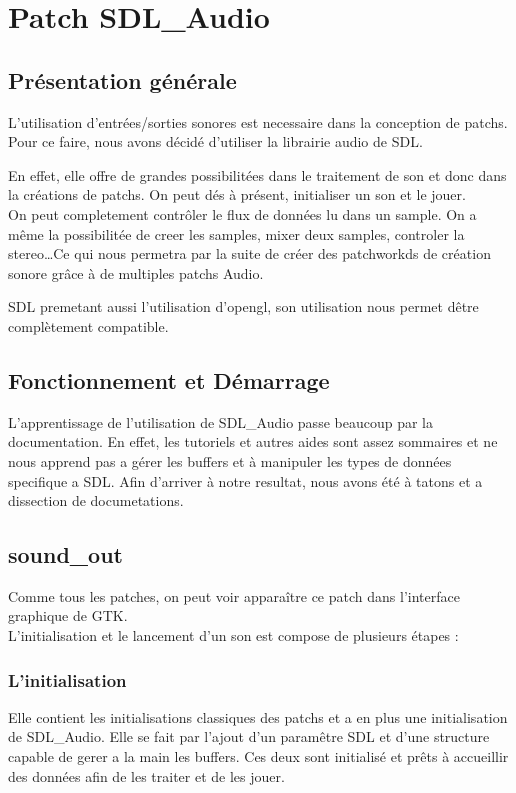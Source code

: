 \newpage
\section{Patch SDL\_Audio}

\subsection{Pr\'esentation g\'en\'erale}
\par
L'utilisation d'entr\'ees/sorties sonores est necessaire dans la conception de 
patchs. Pour ce faire, nous avons d\'ecid\'e d'utiliser la librairie audio de SDL. 
\\
\par
En effet, elle offre de grandes possibilit\'ees dans le traitement de son et donc 
dans la cr\'eations de patchs. On peut d\'es \`a pr\'esent, initialiser un son 
et le jouer. 
\\
On peut completement contr\^oler le flux de donn\'ees lu dans un sample. 
On a m\^eme la possibilit\'ee de creer les samples, mixer deux samples, controler 
la stereo\ldots Ce qui nous permetra par la suite de cr\'eer des patchworkds de 
cr\'eation sonore gr\^ace \`a de multiples patchs Audio.
\\
\par
SDL premetant aussi l'utilisation d'opengl, son utilisation nous permet d\^etre 
compl\`etement compatible.

\subsection{Fonctionnement et D\'emarrage}
L'apprentissage de l'utilisation de SDL\_Audio passe beaucoup par la documentation. 
En effet, les tutoriels et autres aides sont assez sommaires et ne nous apprend pas a 
g\'erer les buffers et \`a manipuler les types de donn\'ees specifique a SDL. Afin 
d'arriver \`a notre resultat, nous avons \'et\'e \`a tatons et a dissection de documetations.

\newpage
\subsection{sound\_out}
\par
Comme tous les patches, on peut voir appara\^itre ce patch dans l'interface graphique de GTK.
\\
L'initialisation et le lancement d'un son est compose de plusieurs \'etapes :
\subsubsection{L'initialisation}
\par
Elle contient les initialisations classiques des patchs et a en plus une 
initialisation de SDL\_Audio. Elle se fait par l'ajout d'un param\^etre SDL 
et d'une structure capable de gerer a la main les buffers. Ces deux sont 
initialis\'e et pr\^ets \`a accueillir des donn\'ees afin de les traiter et de 
les jouer.
